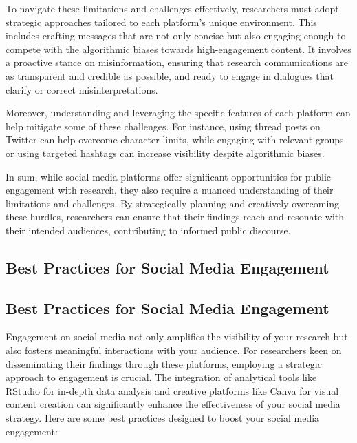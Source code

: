 \documentclass[
]{book}
\begin{document}
To navigate these limitations and challenges effectively, researchers must adopt strategic approaches tailored to each platform's unique environment. This includes crafting messages that are not only concise but also engaging enough to compete with the algorithmic biases towards high-engagement content. It involves a proactive stance on misinformation, ensuring that research communications are as transparent and credible as possible, and ready to engage in dialogues that clarify or correct misinterpretations.

Moreover, understanding and leveraging the specific features of each platform can help mitigate some of these challenges. For instance, using thread posts on Twitter can help overcome character limits, while engaging with relevant groups or using targeted hashtags can increase visibility despite algorithmic biases.

In sum, while social media platforms offer significant opportunities for public engagement with research, they also require a nuanced understanding of their limitations and challenges. By strategically planning and creatively overcoming these hurdles, researchers can ensure that their findings reach and resonate with their intended audiences, contributing to informed public discourse.

\hypertarget{best-practices-for-social-media-engagement}{%
\subsection*{Best Practices for Social Media Engagement}\label{best-practices-for-social-media-engagement}}

\hypertarget{best-practices-for-social-media-engagement-1}{%
\subsection{Best Practices for Social Media Engagement}\label{best-practices-for-social-media-engagement-1}}

Engagement on social media not only amplifies the visibility of your research but also fosters meaningful interactions with your audience. For researchers keen on disseminating their findings through these platforms, employing a strategic approach to engagement is crucial. The integration of analytical tools like RStudio for in-depth data analysis and creative platforms like Canva for visual content creation can significantly enhance the effectiveness of your social media strategy. Here are some best practices designed to boost your social media engagement:
\end{document}

